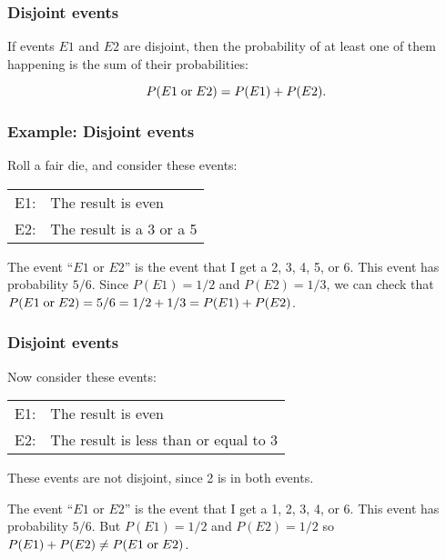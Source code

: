 \begin{frame}
\frametitle{Disjoint events}

If events $E1$ and $E2$ are disjoint, then the probability of at least
one of them happening is the sum of their probabilities:

$$
P(E1\;{\rm or}\;E2) = P(E1) + P(E2).
$$
\end{frame}

\begin{frame}
\frametitle{Example: Disjoint events}
Roll a fair die, and consider these events:

\begin{center}
\begin{tabular}{ll}
E1:& The result is even\\
E2:& The result is a 3 or a 5
\end{tabular}
\end{center}

The event ``$E1$ or $E2$'' is the event that I get a 2, 3, 4, 5, or 6.
This event has probability $5/6$.  Since $P(E1) = 1/2$ and $P(E2) =
1/3$, we can check that $P(E1\;{\rm or}\;E2) = 5/6 = 1/2 + 1/3 = P(E1)
+ P(E2)$.

\end{frame}

\begin{frame}
\frametitle{Disjoint events}

Now consider these events:

\begin{center}
\begin{tabular}{ll}
E1:& The result is even\\
E2:& The result is less than or equal to 3
\end{tabular}
\end{center}

These events are not disjoint, since 2 is in both events.

The event ``$E1$ or $E2$'' is the event that I get a 1, 2, 3, 4, or 6.
This event has probability $5/6$.  But $P(E1) = 1/2$ and $P(E2) = 1/2$
so $P(E1)+P(E2) \ne P(E1\;{\rm or}\;E2)$.

\end{frame}

